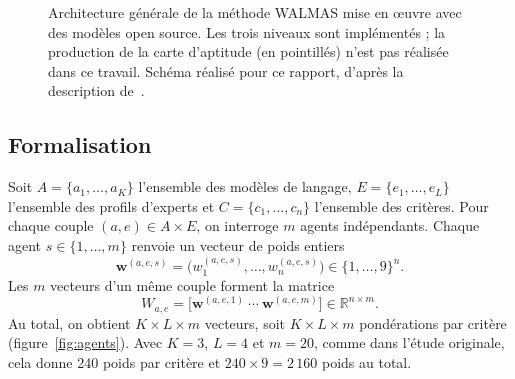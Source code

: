 \documentclass[11pt,a4paper]{article}
\begin{document}
\begin{figure}[htbp]
\caption{Architecture générale de la méthode WALMAS mise en œuvre avec des modèles open source. Les trois niveaux sont implémentés ; la production de la carte d'aptitude (en pointillés) n'est pas réalisée dans ce travail. Schéma réalisé pour ce rapport, d'après la description de~\cite{vahidnia}.}
\label{fig:archi}
\end{figure}

\subsection{Formalisation}

Soit $A=\{a_1,\dots,a_K\}$ l'ensemble des modèles de langage, $E=\{e_1,\dots,e_L\}$ l'ensemble des profils d'experts et $C=\{c_1,\dots,c_n\}$ l'ensemble des critères. Pour chaque couple $(a,e)\in A\times E$, on interroge $m$ agents indépendants. Chaque agent $s\in\{1,\dots,m\}$ renvoie un vecteur de poids entiers
\begin{equation}\label{eq:wvec}
  \mathbf{w}^{(a,e,s)}=\bigl(w_1^{(a,e,s)},\dots,w_n^{(a,e,s)}\bigr)\in\{1,\dots,9\}^n .
\end{equation}
Les $m$ vecteurs d'un même couple forment la matrice
\begin{equation}\label{eq:Wae}
  W_{a,e}=\bigl[\mathbf{w}^{(a,e,1)}\ \cdots\ \mathbf{w}^{(a,e,m)}\bigr]\in\mathbb{R}^{n\times m}.
\end{equation}
Au total, on obtient $K\times L\times m$ vecteurs, soit $K\times L\times m$ pondérations par critère (figure~\ref{fig:agents}). Avec $K=3$, $L=4$ et $m=20$, comme dans l'étude originale, cela donne 240 poids par critère et $240\times 9=2\,160$ poids au total.
\end{document}
